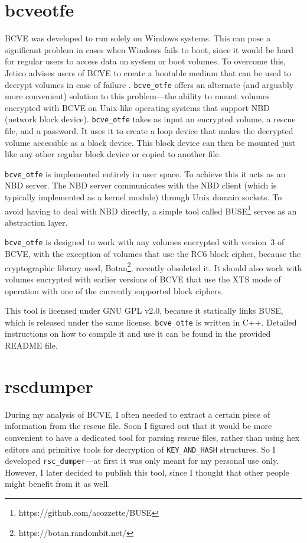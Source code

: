 \documentclass[thesis=B,english]{FITthesis}[2012/10/20]
\begin{document}
	\section{bcve\textunderscore{}otfe}
	
	BCVE was developed to run solely on Windows systems. This can pose a significant problem in cases when Windows fails to boot, since it would be hard for regular users to access data on system or boot volumes. To overcome this, Jetico advises users of BCVE to create a bootable medium that can be used to decrypt volumes in case of failure \cite{bcve_help}. \verb|bcve_otfe| offers an alternate (and arguably more convenient) solution to this problem---the ability to mount volumes encrypted with BCVE on Unix-like operating systems that support NBD (network block device). \verb|bcve_otfe| takes as input an encrypted volume, a rescue file, and a password. It uses it to create a loop device that makes the decrypted volume accessible as a block device. This block device can then be mounted just like any other regular block device or copied to another file. 
	
	\verb|bcve_otfe| is implemented entirely in user space. To achieve this it acts as an NBD server. The NBD server communicates with the NBD client (which is typically implemented as a kernel module) through Unix domain sockets. To avoid having to deal with NBD directly, a simple tool called BUSE\footnote{https://github.com/acozzette/BUSE} serves as an abstraction layer.
	
	\verb|bcve_otfe| is designed to work with any volumes encrypted with version~3 of BCVE, with the exception of volumes that use the RC6 block cipher, because the cryptographic library used, Botan\footnote{https://botan.randombit.net/}, recently obsoleted it. It should also work with volumes encrypted with earlier versions of BCVE that use the XTS mode of operation with one of the currently supported block ciphers.
	
	This tool is licensed under GNU GPL v2.0, because it statically links BUSE, which is released under the same license. \verb|bcve_otfe| is written in C++. Detailed instructions on how to compile it and use it can be found in the provided README file.
	
	\section{rsc\textunderscore{}dumper}
	
	During my analysis of BCVE, I often needed to extract a certain piece of information from the rescue file. Soon I figured out that it would be more convenient to have a dedicated tool for parsing rescue files, rather than using hex editors and primitive tools for decryption of \verb|KEY_AND_HASH| structures. So I developed \verb|rsc_dumper|---at first it was only meant for my personal use only. However, I later decided to publish this tool, since I thought that other people might benefit from it as well.  
	
\end{document}

